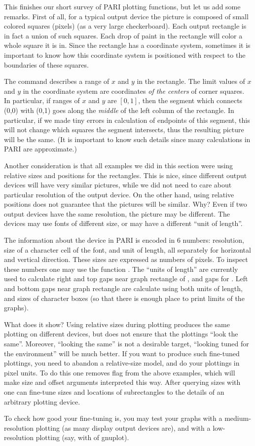 This finishes our short survey of PARI plotting functions, but let us add
some remarks.  First of all, for a typical output device the picture is
composed of small colored squares (pixels) (as a very large checkerboard).
Each output rectangle is in fact a union of such squares.  Each drop
of paint in the rectangle will color a whole square it is in.  Since the
rectangle has a coordinate system, sometimes it is important to know how
this coordinate system is positioned with respect to the boundaries of
these squares.

The command  describes a range of $x$ and $y$ in the
rectangle.  The limit values of $x$ and $y$ in the coordinate system are
coordinates \emph{of the centers} of corner squares.  In particular,
if ranges of $x$ and $y$ are $[0,1]$, then the segment which connects (0,0)
with (0,1) goes along the \emph{middle} of the left column of the rectangle.
In particular, if we made tiny errors in calculation of endpoints of this
segment, this will not change which squares the segment intersects, thus
the resulting picture will be the same.  (It is important to know such details
since many calculations in PARI are approximate.)

Another consideration is that all examples we did in this section were
using relative sizes and positions for the rectangles.  This is nice, since
different output devices will have very similar pictures, while we
did not need to care about particular resolution of the output device.
On the other hand,
using relative positions does not guarantee that the pictures will be
similar.  Why?  Even if two output devices have the same resolution,
the picture may be different.  The devices may use fonts of different
size, or may have a different ``unit of length''.

The information about the device in PARI is encoded in 6 numbers: resolution,
size of a character cell of the font, and unit of length, all separately
for horizontal and vertical direction.  These sizes are expressed as
numbers of pixels.  To inspect these numbers one may use the function
.  The ``units of length'' are currently used to calculate
right and top gaps near graph rectangle of , and gaps for
.  Left and bottom gaps near graph rectangle are calculate
using both units of length, and sizes of character boxes (so that there
is enough place to print limits of the graphs).

What does it show?  Using relative sizes during plotting produces
 the same plotting on different devices, but does not
ensure that the plottings ``look the same''.  Moreover, ``looking the
same'' is not a desirable target, ``looking tuned for the environment''
will be much better.  If you want to produce such fine-tuned plottings,
you need to abandon a relative-size model, and do your plottings in
pixel units.  To do this one removes flag  from the above
examples, which will make size and offset arguments interpreted this way.
After querying sizes with  one can fine-tune sizes and
locations of subrectangles to the details of an arbitrary plotting
device.

To check how good your fine-tuning is, you may test your graphs with a
medium-resolution plotting (as many display output devices are), and
with a low-resolution plotting (say, with  of gnuplot).
\vfill\eject\bye
